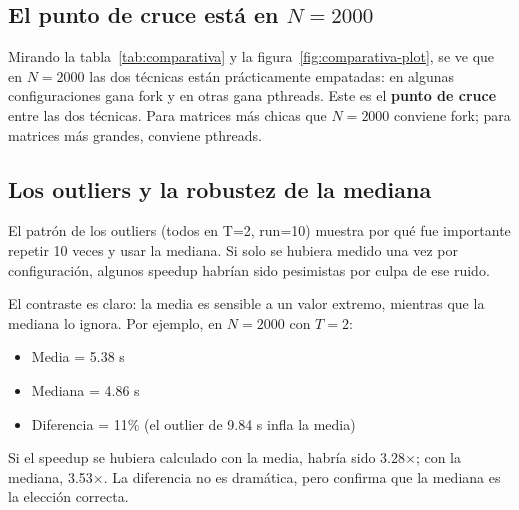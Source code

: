 \subsection{El punto de cruce está en $N = 2000$}

Mirando la tabla~\ref{tab:comparativa} y la figura~\ref{fig:comparativa-plot}, se ve que en $N = 2000$ las dos técnicas están prácticamente empatadas: en algunas configuraciones gana fork y en otras gana pthreads. Este es el \textbf{punto de cruce} entre las dos técnicas. Para matrices más chicas que $N = 2000$ conviene fork; para matrices más grandes, conviene pthreads.

\subsection{Los outliers y la robustez de la mediana}

El patrón de los outliers (todos en T=2, run=10) muestra por qué fue importante repetir 10 veces y usar la mediana. Si solo se hubiera medido una vez por configuración, algunos speedup habrían sido pesimistas por culpa de ese ruido.

El contraste es claro: la media es sensible a un valor extremo, mientras que la mediana lo ignora. Por ejemplo, en $N = 2000$ con $T = 2$:

\begin{itemize}
    \item Media = 5.38 s
    \item Mediana = 4.86 s
    \item Diferencia = 11\% (el outlier de 9.84 s infla la media)
\end{itemize}

Si el speedup se hubiera calculado con la media, habría sido 3.28$\times$; con la mediana, 3.53$\times$. La diferencia no es dramática, pero confirma que la mediana es la elección correcta.
